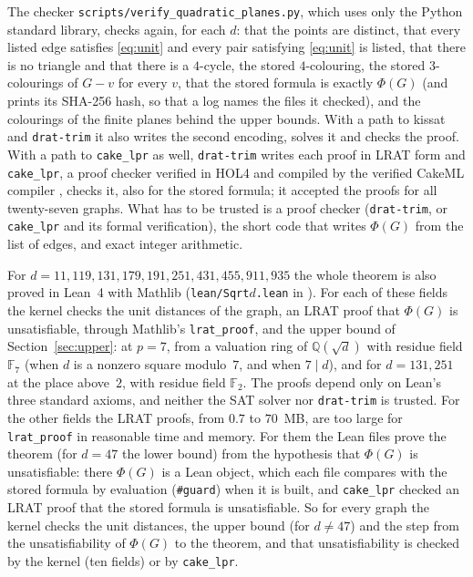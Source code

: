 \documentclass[11pt,a4paper]{amsart}
\theoremstyle{remark}
\newcommand{\F}{\mathbb{F}}
\newcommand{\Q}{\mathbb{Q}}
\begin{document}
The checker \texttt{scripts/verify\_quadratic\_planes.py}, which uses only the Python standard library, checks
again, for each $d$: that the points are distinct, that every listed edge satisfies \eqref{eq:unit} and every
pair satisfying \eqref{eq:unit} is listed, that there is no triangle and that there is a $4$-cycle, the
stored $4$-colouring, the stored
$3$-colourings of $G-v$ for every $v$, that the stored formula is exactly $\Phi(G)$ (and prints its SHA-256
hash, so that a log names the files it checked), and the colourings of the
finite planes behind the upper bounds. With a path to kissat and \texttt{drat-trim} it also writes the second
encoding, solves it and checks the proof. With a path to \texttt{cake\_lpr} as well, \texttt{drat-trim} writes
each proof in LRAT form and \texttt{cake\_lpr}, a proof checker verified in HOL4 and compiled by the verified
CakeML compiler \cite{cakelpr}, checks it, also for the stored formula; it accepted the proofs for all
twenty-seven graphs. What has to be trusted
is a proof checker (\texttt{drat-trim}, or \texttt{cake\_lpr} and its formal verification), the short code that
writes $\Phi(G)$ from the list of edges, and exact integer arithmetic.

For $d=11,119,131,179,191,251,431,455,911,935$ the whole theorem is also proved in Lean~4 \cite{Lean} with
Mathlib \cite{mathlib} (\texttt{lean/Sqrt$d$.lean} in \cite{Repo}). For each of these fields the kernel checks
the unit distances of the graph, an LRAT proof that $\Phi(G)$ is unsatisfiable, through Mathlib's
\texttt{lrat\_proof}, and the upper bound of Section~\ref{sec:upper}: at $p=7$, from a valuation ring of
$\Q(\sqrt d)$ with residue field $\F_7$ (when $d$ is a nonzero square modulo~$7$, and when $7\mid d$), and for
$d=131,251$ at the place above~$2$, with residue field $\F_2$. The proofs depend only on Lean's three standard
axioms, and neither the SAT solver nor \texttt{drat-trim} is trusted. For the other fields the LRAT proofs,
from $0.7$ to $70$~MB, are too large for \texttt{lrat\_proof} in reasonable time and memory. For them the
Lean files prove the theorem (for $d=47$ the lower bound) from the hypothesis that $\Phi(G)$ is
unsatisfiable: there $\Phi(G)$ is a Lean object, which each file compares with the stored formula by evaluation
(\texttt{\#guard}) when it is built, and \texttt{cake\_lpr} checked an LRAT proof that the stored formula is
unsatisfiable. So for every graph the kernel checks the unit distances, the upper bound (for $d\ne47$) and
the step from the unsatisfiability of $\Phi(G)$ to the theorem, and that unsatisfiability is checked by the
kernel (ten fields) or by \texttt{cake\_lpr}.
\end{document}
